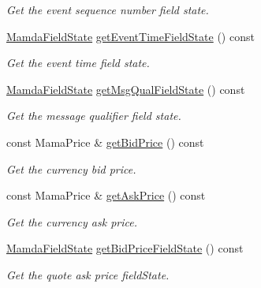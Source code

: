\begin{CompactItemize}
\begin{CompactList}\small\item\em Get the event sequence number field state. \item\end{CompactList}\item 
\hyperlink{namespaceWombat_93aac974f2ab713554fd12a1fa3b7d2a}{Mamda\-Field\-State} \hyperlink{classWombat_1_1MamdaCurrencyListener_88df072f42678a7b2bb71e6c88e97dac}{get\-Event\-Time\-Field\-State} () const 
\begin{CompactList}\small\item\em Get the event time field state. \item\end{CompactList}\item 
\hyperlink{namespaceWombat_93aac974f2ab713554fd12a1fa3b7d2a}{Mamda\-Field\-State} \hyperlink{classWombat_1_1MamdaCurrencyListener_36f04bd57be711459aedc2857be8b621}{get\-Msg\-Qual\-Field\-State} () const 
\begin{CompactList}\small\item\em Get the message qualifier field state. \item\end{CompactList}\item 
const Mama\-Price \& \hyperlink{classWombat_1_1MamdaCurrencyListener_3563aac40f16c6dd61f64e9d9c2e1b2e}{get\-Bid\-Price} () const 
\begin{CompactList}\small\item\em Get the currency bid price. \item\end{CompactList}\item 
const Mama\-Price \& \hyperlink{classWombat_1_1MamdaCurrencyListener_7e0b54e9607f5e4770ab22d2da0c63fe}{get\-Ask\-Price} () const 
\begin{CompactList}\small\item\em Get the currency ask price. \item\end{CompactList}\item 
\hyperlink{namespaceWombat_93aac974f2ab713554fd12a1fa3b7d2a}{Mamda\-Field\-State} \hyperlink{classWombat_1_1MamdaCurrencyListener_5db8b40b06fe6b4fb3fa1e388502a8c2}{get\-Bid\-Price\-Field\-State} () const 
\begin{CompactList}\small\item\em Get the quote ask price field\-State. \item\end{CompactList}\item 

\end{CompactItemize}
